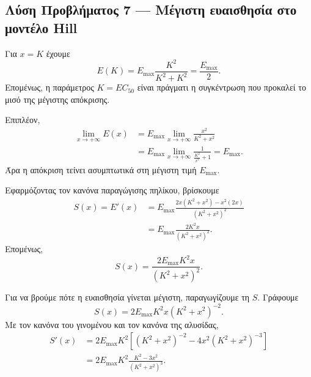 \subsection*{Λύση Προβλήματος 7 --- Μέγιστη ευαισθησία στο μοντέλο Hill}

\begin{alist}
  \item Για $x=K$ έχουμε
        \[
          E(K)
          =E_{\max}\frac{K^2}{K^2+K^2}
          =\frac{E_{\max}}{2}.
        \]
        Επομένως, η παράμετρος $K=EC_{50}$ είναι πράγματι η συγκέντρωση
        που προκαλεί το μισό της μέγιστης απόκρισης.

        Επιπλέον,
        \begin{align*}
          \lim_{x\to+\infty}E(x)
          &=E_{\max}
            \lim_{x\to+\infty}
            \frac{x^2}{K^2+x^2}\\
          &=E_{\max}
            \lim_{x\to+\infty}
            \frac{1}{\frac{K^2}{x^2}+1}
            =E_{\max}.
        \end{align*}
        Άρα η απόκριση τείνει ασυμπτωτικά στη μέγιστη τιμή
        $E_{\max}$.

  \item Εφαρμόζοντας τον κανόνα παραγώγισης πηλίκου, βρίσκουμε
        \begin{align*}
          S(x)=E'(x)
          &=E_{\max}
            \frac{2x(K^2+x^2)-x^2(2x)}
                 {(K^2+x^2)^2}\\
          &=E_{\max}
            \frac{2K^2x}{(K^2+x^2)^2}.
        \end{align*}
        Επομένως,
        \[
          {
          S(x)=\frac{2E_{\max}K^2x}{(K^2+x^2)^2}}.
        \]

  \item Για να βρούμε πότε η ευαισθησία γίνεται μέγιστη,
        παραγωγίζουμε τη $S$. Γράφουμε
        \[
          S(x)=2E_{\max}K^2x(K^2+x^2)^{-2}.
        \]
        Με τον κανόνα του γινομένου και τον κανόνα της αλυσίδας,
        \begin{align*}
          S'(x)
          &=2E_{\max}K^2
            \left[
              (K^2+x^2)^{-2}
              -4x^2(K^2+x^2)^{-3}
            \right]\\
          &=2E_{\max}K^2
            \frac{K^2-3x^2}{(K^2+x^2)^3}.
        \end{align*}


\end{alist}
